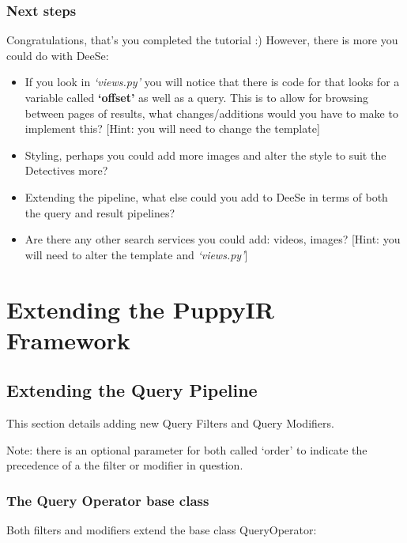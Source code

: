 \documentclass[letterpaper,10pt,english]{sphinxmanual}
\begin{document}
\subsection{Next steps}
\label{pipeline-tutorial:next-steps}
Congratulations, that's you completed the tutorial :) However, there is more you could do with DeeSe:
\begin{itemize}
\item {} 
If you look in \emph{`views.py'} you will notice that there is code for that looks for a variable called \textbf{`offset'} as well as a query. This is to allow for browsing between pages of results, what changes/additions would you have to make to implement this? {[}Hint: you will need to change the template{]}

\item {} 
Styling, perhaps you could add more images and alter the style to suit the Detectives more?

\item {} 
Extending the pipeline, what else could you add to DeeSe in terms of both the query and result pipelines?

\item {} 
Are there any other search services you could add: videos, images? {[}Hint: you will need to alter the template and \emph{`views.py'}{]}

\end{itemize}


\chapter{Extending the PuppyIR Framework}
\label{index:extending-the-puppyir-framework}

\section{Extending the Query Pipeline}
\label{extendingQuery:extending-the-query-pipeline}\label{extendingQuery::doc}\label{extendingQuery:id1}
This section details adding new Query Filters and Query Modifiers.

Note: there is an optional parameter for both called `order' to indicate the precedence of a the filter or modifier in question.


\subsection{The Query Operator base class}
\label{extendingQuery:the-query-operator-base-class}
Both filters and modifiers extend the base class QueryOperator:
\end{document}
